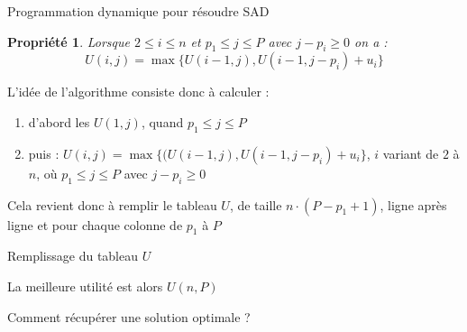 \documentclass[aspectratio=1610,francais,envcountsect]{beamer}
\newtheorem{property}[theorem]{Propriété}
\begin{document}
\begin{frame}[allowframebreaks]{Programmation dynamique pour résoudre
    SAD}
  \begin{property}Lorsque $2\leq i \leq n$ et $p_1 \leq j \leq P$ avec
    $j-p_i\geq 0$ on a :
    \begin{equation*}
      U(i,j) = \max \{U(i-1,j),U(i-1,j-p_i)+u_i\}
    \end{equation*}
 
  \end{property}

  \framebreak

  L’idée de l’algorithme consiste donc à calculer :

  \begin{enumerate}
  \item d’abord les $U(1, j)$, quand $p_1 \leq j \leq P$
  \item puis :
    $U(i, j) = \max\{(U(i - 1, j), U(i - 1, j - p_i) + u_i\}$, $i$
    variant de $2$ à $n$, où $p_1 \leq j \leq P$ avec $j - p_i \geq 0$
  \end{enumerate}


  Cela revient donc à remplir le tableau $U$, de taille
  $n\cdot(P - p_1 + 1)$, ligne après ligne et pour chaque colonne de
  $p_1$ à $P$

  \framebreak

  \begin{block}{Remplissage du tableau $U$}
    \begin{algorithm}[H]
      \DontPrintSemicolon {} 
    \end{algorithm}
  \end{block}


\begin{center}
  La meilleure utilité est alors $U(n,P)$
\end{center}

\framebreak

\begin{block}{Comment récupérer une solution optimale ?}


\end{block}
\end{frame}
\end{document}
